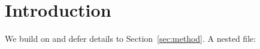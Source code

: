 \section{Introduction}\label{sec:intro}
We build on \cite{knuth1984} and defer details to Section~\ref{sec:method}.
A nested file: 
